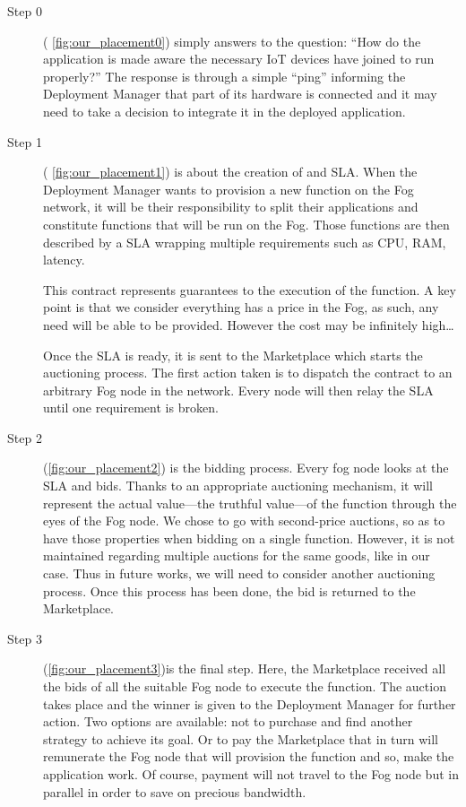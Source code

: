 \begin{description}
	\item[Step 0]{( \cref{fig:our_placement0}) simply answers to the question: “How do the application is made aware the necessary \gls{IoT} devices have joined to run properly?”
	            The response is through a simple “ping” informing the Deployment Manager that part of its hardware is connected and it may need to take a decision to integrate it in the deployed application.
	      }
	\item[Step 1]{( \cref{fig:our_placement1}) is about the creation of and \gls{SLA}. When the Deployment Manager wants to provision a new function on the Fog network, it will be their responsibility to split their applications and constitute functions that will be run on the Fog. Those functions are then described by a \gls{SLA} wrapping multiple requirements such as CPU, RAM, latency.

	            This contract represents guarantees to the execution of the function. A key point is that we consider everything has a price in the Fog, as such, any need will be able to be provided. However the cost may be infinitely high…

	            Once the \gls{SLA} is ready, it is sent to the Marketplace which starts the auctioning process. The first action taken is to dispatch the contract to an arbitrary Fog node in the network. Every node will then relay the \gls{SLA} until one requirement is broken.
	      }
	\item[Step 2]{ (\cref{fig:our_placement2}) is the bidding process. Every fog node looks at the \gls{SLA} and bids. Thanks to an appropriate auctioning mechanism, it will represent the actual value—the truthful value—of the function through the eyes of the Fog node. We chose to go with second-price auctions, so as to have those properties when bidding on a single function. However, it is not maintained regarding multiple auctions for the same goods, like in our case. Thus in future works, we will need to consider another auctioning process. Once this process has been done, the bid is returned to the Marketplace.}
	\item[Step 3]{ (\cref{fig:our_placement3})is the final step. Here, the Marketplace received all the bids of all the suitable Fog node to execute the function. The auction takes place and the winner is given to the Deployment Manager for further action. Two options are available: not to purchase and find another strategy to achieve its goal. Or to pay the Marketplace that in turn will remunerate the Fog node that will provision the function and so, make the application work. Of course, payment will not travel to the Fog node but in parallel in order to save on precious bandwidth.}
\end{description}

